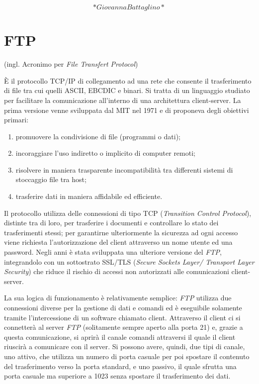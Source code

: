 \documentclass[
  b5paper,
  twoside,
  11pt,
  chapterprefix=false,
  bibliography=totocnumbered,
  parskip=0]{scrbook}
\begin{document}
\[*Giovanna Battaglino*\]

\hypertarget{ftp}{%
\chapter{FTP}\label{ftp}}

(ingl. Acronimo per \emph{File Transfert Protocol})

È il protocollo TCP/IP di collegamento ad una rete che consente il
trasferimento di file tra cui quelli ASCII, EBCDIC e binari. Si tratta
di un linguaggio studiato per facilitare la comunicazione all'interno di
una architettura client-server. La prima versione venne sviluppata dal
MIT nel 1971 e di proponeva degli obiettivi primari:

\begin{enumerate}
\def\labelenumi{\arabic{enumi}.}
\item
  promuovere la condivisione di file (programmi o dati);
\item
  incoraggiare l'uso indiretto o implicito di computer remoti;
\item
  risolvere in maniera trasparente incompatibilità tra differenti
  sistemi di stoccaggio file tra host;
\item
  trasferire dati in maniera affidabile ed efficiente.
\end{enumerate}

Il protocollo utilizza delle connessioni di tipo TCP (\emph{Transition
Control Protocol}), distinte tra di loro, per trasferire i documenti e
controllare lo stato dei trasferimenti stessi; per garantirne
ulteriormente la sicurezza ad ogni accesso viene richiesta
l'autorizzazione del client attraverso un nome utente ed una password.
Negli anni è stata sviluppata una ulteriore versione del \emph{FTP},
integrandolo con un sottostrato SSL/TLS (\emph{Secure Sockets Layer/
Transport Layer Security}) che riduce il rischio di accessi non
autorizzati alle comunicazioni client-server.

La sua logica di funzionamento è relativamente semplice: \emph{FTP} utilizza
due connessioni diverse per la gestione di dati e comandi ed è
eseguibile solamente tramite l'intercessione di un software chiamato
client. Attraverso il client ci si connetterà al server \emph{FTP}
(solitamente sempre aperto alla porta 21) e, grazie a questa
comunicazione, si aprirà il canale comandi attraversi il quale il client
riuscirà a comunicare con il server. Si possono avere, quindi, due tipi
di canale, uno attivo, che utilizza un numero di porta casuale per poi
spostare il contenuto del trasferimento verso la porta standard, e uno
passivo, il quale sfrutta una porta casuale ma superiore a 1023 senza
spostare il trasferimento dei dati.
\end{document}

